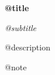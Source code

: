 \hypersetup{pageanchor=false}
\begin{titlepage}
\thispagestyle{empty}
\centering
\vspace*{0.12\textheight}
{\Huge\bfseries @{title}\par}
\vspace{0.8em}
{\Large\itshape @{subtitle}\par}
\vspace{0.7em}
{\large @{description}\par}
\vfill
{\small @{note}\par}
\end{titlepage}
